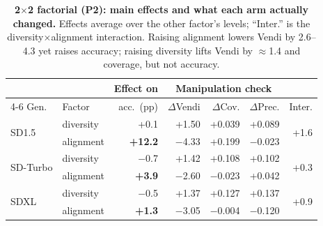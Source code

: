 \begin{table}[t]
\centering\footnotesize
\setlength{\tabcolsep}{2pt}
\begin{tabular}{@{}llrrrrr@{}}
\toprule
 & & Effect on & \multicolumn{3}{c}{Manipulation check} & \\
\cmidrule(lr){4-6}
Gen. & Factor & acc.\ (pp) & $\Delta$Vendi & $\Delta$Cov. & $\Delta$Prec. & Inter. \\
\midrule
\multirow{2}{*}{SD1.5} & diversity & +0.1 & +1.50 & +0.039 & +0.089 & \multirow{2}{*}{+1.6} \\
 & alignment & \textbf{+12.2} & $-$4.33 & +0.199 & $-$0.023 & \\
\midrule
\multirow{2}{*}{SD-Turbo} & diversity & $-$0.7 & +1.42 & +0.108 & +0.102 & \multirow{2}{*}{+0.3} \\
 & alignment & \textbf{+3.9} & $-$2.60 & $-$0.023 & +0.042 & \\
\midrule
\multirow{2}{*}{SDXL} & diversity & $-$0.5 & +1.37 & +0.127 & +0.137 & \multirow{2}{*}{+0.9} \\
 & alignment & \textbf{+1.3} & $-$3.05 & $-$0.004 & $-$0.120 & \\
\bottomrule
\end{tabular}
\caption{\textbf{2$\times$2 factorial (P2): main effects and what each arm actually changed.} Effects average over the other factor's levels; ``Inter.'' is the diversity$\times$alignment interaction. Raising alignment lowers Vendi by 2.6--4.3 yet raises accuracy; raising diversity lifts Vendi by $\approx$1.4 and coverage, but not accuracy.}
\label{tab:factorial}
\end{table}
